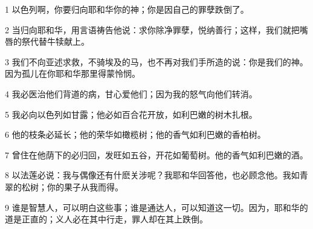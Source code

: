 \par 1 以色列啊，你要归向耶和华你的神；你是因自己的罪孽跌倒了。
\par 2 当归向耶和华，用言语祷告他说：求你除净罪孽，悦纳善行；这样，我们就把嘴唇的祭代替牛犊献上。
\par 3 我们不向亚述求救，不骑埃及的马，也不再对我们手所造的说：你是我们的神。因为孤儿在你耶和华那里得蒙怜悯。
\par 4 我必医治他们背道的病，甘心爱他们；因为我的怒气向他们转消。
\par 5 我必向以色列如甘露；他必如百合花开放，如利巴嫩的树木扎根。
\par 6 他的枝条必延长；他的荣华如橄榄树；他的香气如利巴嫩的香柏树。
\par 7 曾住在他荫下的必归回，发旺如五谷，开花如葡萄树。他的香气如利巴嫩的酒。
\par 8 以法莲必说：我与偶像还有什麽关涉呢？我耶和华回答他，也必顾念他。我如青翠的松树；你的果子从我而得。
\par 9 谁是智慧人，可以明白这些事；谁是通达人，可以知道这一切。因为，耶和华的道是正直的；义人必在其中行走，罪人却在其上跌倒。



